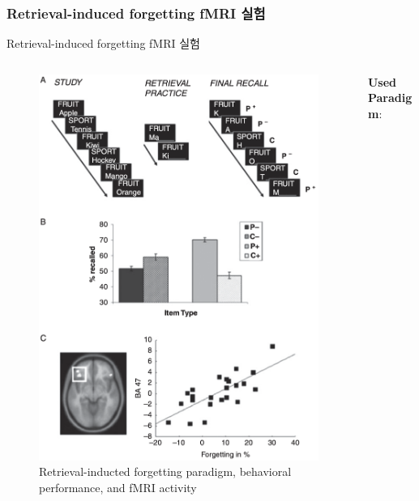 \documentclass{beamer}
\begin{document}
\subsubsection{Retrieval-induced forgetting fMRI 실험}
\begin{frame}{Retrieval-induced forgetting fMRI 실험}
  \begin{columns}
    \begin{column}{0.38\textwidth}
      \begin{figure}
        \includegraphics[width=\textwidth]{image/Retrieval-induced_forgetting}
        \caption{Retrieval-inducted forgetting paradigm, behavioral performance, and fMRI activity}
      \end{figure}
    \end{column}
    \hfill
    \begin{column}{0.6\textwidth}
      \textbf{Used Paradigm}:
      \vspace{-0.5em}

\end{column}
\end{columns}
\end{frame}
\end{document}
